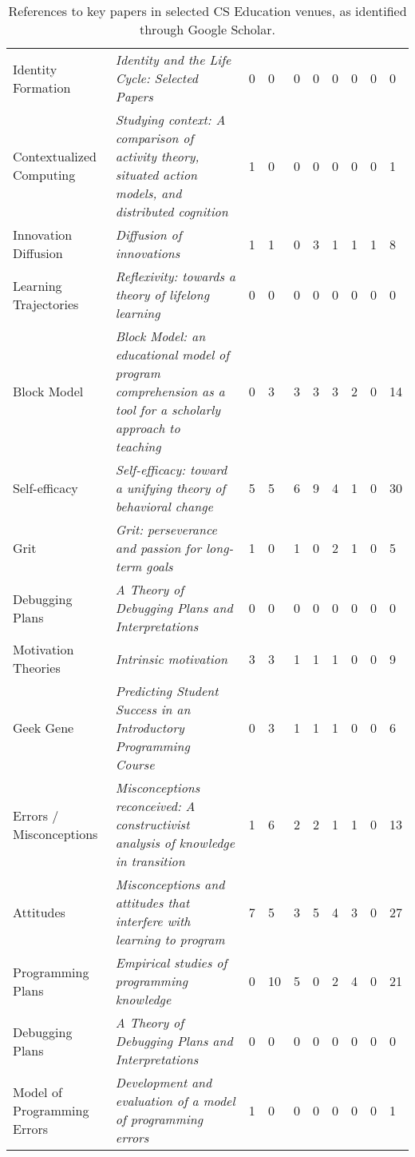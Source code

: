 \begin{table*}[t]
\begin{tabular}{p{3cm}p{7cm}llllllll}
Identity Formation & \textit{Identity and the Life Cycle: Selected Papers}~\cite{erikson1968identity} & 0 & 0 & 0 & 0 & 0 & 0 & 0 & 0\\
Contextualized Computing & \textit{Studying context: A comparison of activity theory, situated action models, and distributed cognition}~\cite{nardi1996studying} & 1 & 0 & 0 & 0 & 0 & 0 & 0 & 1\\
Innovation Diffusion & \textit{Diffusion of innovations}~\cite{rogers1962diffusion} & 1 & 1 & 0 & 3 & 1 & 1 & 1 & 8\\
Learning Trajectories & \textit{Reflexivity: towards a theory of lifelong learning}~\cite{edwards2002reflexivity} & 0 & 0 & 0 & 0 & 0 & 0 & 0 & 0\\

Block Model & \textit{Block Model: an educational model of program comprehension as a tool for a scholarly approach to teaching}~\cite{schulte2008block} & 0 & 3 & 3 & 3 & 3 & 2 & 0 & 14\\
Self-efficacy & \textit{Self-efficacy: toward a unifying theory of behavioral change}~\cite{bandura1977self} & 5 & 5 & 6 & 9 & 4 & 1 & 0 & 30\\
Grit & \textit{Grit: perseverance and passion for long-term goals}~\cite{duckworth2007grit} & 1 & 0 & 1 & 0 & 2 & 1 & 0 & 5\\
Debugging Plans & \textit{A Theory of Debugging Plans and Interpretations}~\cite{simmons1988theory} & 0 & 0 & 0 & 0 & 0 & 0 & 0 & 0\\
Motivation Theories & \textit{Intrinsic motivation}~\cite{deci2010intrinsic} & 3 & 3 & 1 & 1 & 1 & 0 & 0 & 9\\
Geek Gene & \textit{Predicting Student Success in an Introductory Programming Course}~\cite{Hostetler:1983} & 0 & 3 & 1 & 1 & 1 & 0 & 0 & 6\\
Errors / Misconceptions & \textit{Misconceptions reconceived: A constructivist analysis of knowledge in transition}~\cite{smith1994misconceptions} & 1 & 6 & 2 & 2 & 1 & 1 & 0 & 13\\
Attitudes & \textit{Misconceptions and attitudes that interfere with learning to program}~\cite{clancy2004misconceptions} & 7 & 5 & 3 & 5 & 4 & 3 & 0 & 27\\
Programming Plans & \textit{Empirical studies of programming knowledge}~\cite{soloway1984empirical} & 0 & 10 & 5 & 0 & 2 & 4 & 0 & 21\\
Debugging Plans & \textit{A Theory of Debugging Plans and Interpretations}~\cite{simmons1988theory} & 0 & 0 & 0 & 0 & 0 & 0 & 0 & 0\\
Model of Programming Errors & \textit{Development and evaluation of a model of programming errors}~\cite{ko2003development} & 1 & 0 & 0 & 0 & 0 & 0 & 0 & 1\\
\end{tabular}
\caption{References to key papers in selected CS Education venues, as identified through Google Scholar.}
\end{table*}